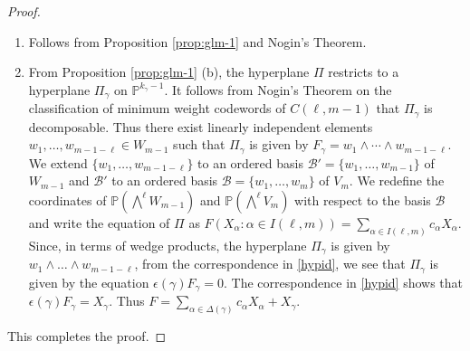 \documentclass[10pt,a4paper,oneside]{amsproc}
\newcommand{\B}{\mathcal{B}}
\def\a{{\alpha}}
\def\PP{{\mathbb P}}
\begin{document}
\begin{proof}
\
\begin{enumerate}
    \item[(a)] Follows from Proposition \ref{prop:glm-1} and Nogin's Theorem. 
    \item[(b)] From Proposition \ref{prop:glm-1} (b), the hyperplane $\Pi$ restricts to a hyperplane $\Pi_{\gamma}$ on $\PP^{k_{\gamma} - 1}$. It follows from Nogin's Theorem on the classification of minimum weight codewords of $C(\ell, m-1)$ that $\Pi_\gamma$ is decomposable. Thus there exist linearly independent elements $w_1, \dots, w_{m-1-\ell} \in W_{m-1}$ such that $\Pi_\gamma$ is given by $F_\gamma = w_1 \wedge \cdots \wedge w_{m-1-\ell}$. We extend $\{w_1, \dots, w_{m-1-\ell}\}$ to an ordered basis ${\B'} =\{w_1, \dots, w_{m-1}\}$ of $W_{m-1}$ and ${\B'}$ to an ordered basis ${\B} = \{w_1, \dots, w_m\}$ of $V_m$. We redefine the coordinates of $\PP\left(\bigwedge^\ell W_{m-1} \right)$ and $\PP\left(\bigwedge^\ell V_{m} \right)$ with respect to the basis ${\B}$ and write the equation of $\Pi$ as $F(X_\a : \a \in I(\ell, m)) = \sum_{\a \in I(\ell, m)} c_\a X_\a$. Since, in terms of wedge products, the hyperplane $\Pi_\gamma$ is given by $w_1 \wedge \dots \wedge w_{m-1-\ell}$, from the correspondence in \eqref{hypid}, we see that $\Pi_\gamma$ is given by the equation $\epsilon(\gamma) F_\gamma = 0$. The correspondence in \eqref{hypid} shows that $\epsilon(\gamma) F_{\gamma} = X_\gamma$. Thus $F = \displaystyle{\sum_{\a \in \Delta (\gamma)}} c_\a X_\a + X_\gamma$.
\end{enumerate}
This completes the proof. 
\end{proof}
\end{document}
